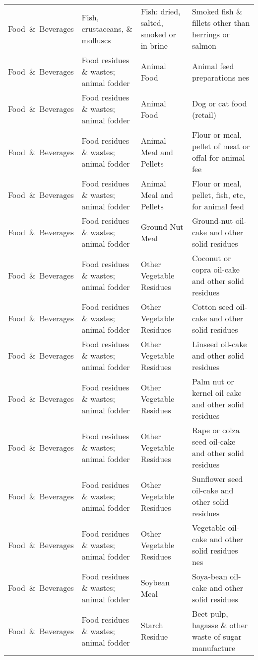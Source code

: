 \begin{appendices}
\begin{xltabular}{\textwidth}{|p{0.10\textwidth}|p{0.30\textwidth}|p{0.20\textwidth}|p{0.30\textwidth}|}
		Food\ \&\ Beverages & Fish, crustaceans, \& molluscs & Fish: dried, salted, smoked or in brine & Smoked fish \& fillets other than herrings or salmon \\
		Food\ \&\ Beverages & Food residues \& wastes; animal fodder & Animal Food & Animal feed preparations nes \\
		Food\ \&\ Beverages & Food residues \& wastes; animal fodder & Animal Food & Dog or cat food (retail) \\
		Food\ \&\ Beverages & Food residues \& wastes; animal fodder & Animal Meal and Pellets & Flour or meal, pellet of meat or offal for animal fee \\
		Food\ \&\ Beverages & Food residues \& wastes; animal fodder & Animal Meal and Pellets & Flour or meal, pellet, fish, etc, for animal feed \\
		Food\ \&\ Beverages & Food residues \& wastes; animal fodder & Ground Nut Meal & Ground-nut oil-cake and other solid residues \\
		Food\ \&\ Beverages & Food residues \& wastes; animal fodder & Other Vegetable Residues & Coconut or copra oil-cake and other solid residues \\
		Food\ \&\ Beverages & Food residues \& wastes; animal fodder & Other Vegetable Residues & Cotton seed oil-cake and other solid residues \\
		Food\ \&\ Beverages & Food residues \& wastes; animal fodder & Other Vegetable Residues & Linseed oil-cake and other solid residues \\
		Food\ \&\ Beverages & Food residues \& wastes; animal fodder & Other Vegetable Residues & Palm nut or kernel oil cake and other solid residues \\
		Food\ \&\ Beverages & Food residues \& wastes; animal fodder & Other Vegetable Residues & Rape or colza seed oil-cake and other solid residues \\
		Food\ \&\ Beverages & Food residues \& wastes; animal fodder & Other Vegetable Residues & Sunflower seed oil-cake and other solid residues \\
		Food\ \&\ Beverages & Food residues \& wastes; animal fodder & Other Vegetable Residues & Vegetable oil-cake and other solid residues nes \\
		Food\ \&\ Beverages & Food residues \& wastes; animal fodder & Soybean Meal & Soya-bean oil-cake and other solid residues \\
		Food\ \&\ Beverages & Food residues \& wastes; animal fodder & Starch Residue & Beet-pulp, bagasse \& other waste of sugar manufacture \\

\end{xltabular}
\end{appendices}
